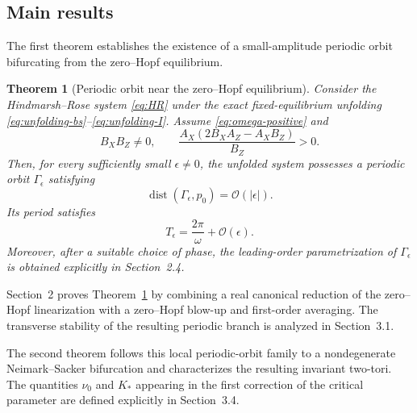 \documentclass[11pt]{amsart}
\newtheorem{theorem}{Theorem}[section]
\theoremstyle{remark}
\newcommand{\cO}{\mathcal{O}}
\begin{document}
\subsection{Main results}

The first theorem establishes the existence of a small-amplitude periodic
orbit bifurcating from the zero--Hopf equilibrium.

\begin{theorem}[Periodic orbit near the zero--Hopf equilibrium]
\label{thm:periodic}
Consider the Hindmarsh--Rose system \eqref{eq:HR} under the exact
fixed-equilibrium unfolding
\eqref{eq:unfolding-bs}--\eqref{eq:unfolding-I}.
Assume \eqref{eq:omega-positive} and
\begin{equation}
\label{eq:periodic-condition}
 B_XB_Z\ne0,
 \qquad
 \frac{A_X(2B_XA_Z-A_XB_Z)}{B_Z}>0.
\end{equation}
Then, for every sufficiently small $\epsilon\ne0$, the unfolded system
possesses a periodic orbit $\Gamma_\epsilon$ satisfying
\begin{equation}
\label{eq:periodic-distance}
 \operatorname{dist}(\Gamma_\epsilon,p_0)=\cO(|\epsilon|).
\end{equation}
Its period satisfies
\begin{equation}
\label{eq:periodic-period}
 T_\epsilon=\frac{2\pi}{\omega}+\cO(\epsilon).
\end{equation}
Moreover, after a suitable choice of phase, the leading-order
parametrization of $\Gamma_\epsilon$ is obtained explicitly in
Section~2.4.
\end{theorem}

Section~2 proves Theorem~\ref{thm:periodic} by combining a real canonical
reduction of the zero--Hopf linearization with a zero--Hopf blow-up and
first-order averaging. The transverse stability of the resulting periodic
branch is analyzed in Section~3.1.

The second theorem follows this local periodic-orbit family to a
nondegenerate Neimark--Sacker bifurcation and characterizes the resulting
invariant two-tori. The quantities $\nu_0$ and $K_*$ appearing in the
first correction of the critical parameter are defined explicitly in
Section~3.4.
\end{document}
